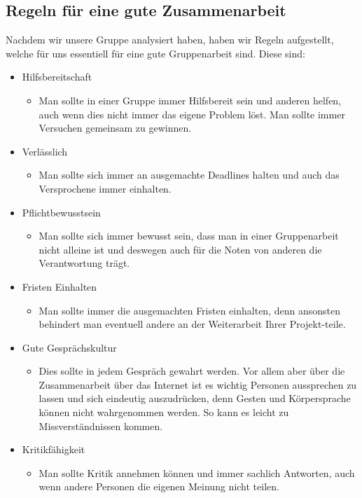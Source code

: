 \documentclass[12pt]{article}
\begin{document}
\subsection{Regeln für eine gute Zusammenarbeit}
Nachdem wir unsere Gruppe analysiert haben, haben wir Regeln aufgestellt, welche für uns essentiell für eine gute Gruppenarbeit sind. Diese sind:
\begin{itemize}
 \item Hilfsbereitschaft
 \begin{itemize}
  \item [] Man sollte in einer Gruppe immer Hilfsbereit sein und anderen helfen, auch wenn dies nicht immer das eigene Problem löst. Man sollte immer Versuchen gemeinsam zu gewinnen.
 \end{itemize}
 \item Verlässlich
 \begin{itemize}
  \item [] Man sollte sich immer an ausgemachte Deadlines halten und auch das Versprochene immer einhalten.
 \end{itemize}
 \item Pflichtbewusstsein
 \begin{itemize}
  \item [] Man sollte sich immer bewusst sein, dass man in einer Gruppenarbeit nicht alleine ist und deswegen auch für die Noten von anderen die Verantwortung trägt.
 \end{itemize}
 \item Fristen Einhalten
 \begin{itemize}
  \item [] Man sollte immer die ausgemachten Fristen einhalten, denn ansonsten behindert man eventuell andere an der Weiterarbeit Ihrer Projekt-teile.
 \end{itemize}
 \item Gute Gesprächskultur
 \begin{itemize}
  \item [] Dies sollte in jedem Gespräch gewahrt werden. Vor allem aber über die Zusammenarbeit über das Internet ist es wichtig Personen aussprechen zu lassen und sich eindeutig auszudrücken, denn Gesten und Körpersprache können nicht wahrgenommen werden. So kann es leicht zu Missverständnissen kommen.
 \end{itemize}
 \item Kritikfähigkeit
 \begin{itemize}
  \item [] Man sollte Kritik annehmen können und immer sachlich Antworten, auch wenn andere Personen die eigenen Meinung nicht teilen.

\end{itemize}
\end{itemize}
\end{document}
